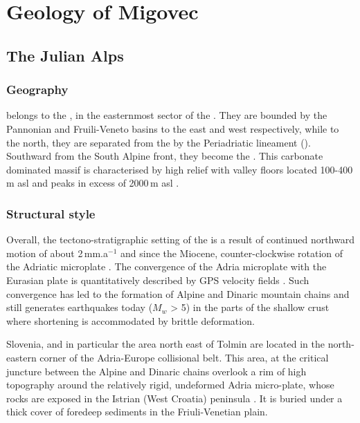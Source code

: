 \chapter{Geology of Migovec}

\section{The Julian Alps}
\label{sec:The Julian Alps}

\subsection{Geography} 
\label{par:Geography} 
 belongs to the , in the easternmost sector of the  \citep{bavec2004late}. 
They  are bounded by the Pannonian and  Fruili-Veneto basins to the east and west respectively, while to the north, they are separated from the  by the Periadriatic lineament (). Southward from the South Alpine front, they become the  \citep{placer1998contribution,burrato2008sources}.
This carbonate dominated massif is characterised by high relief with valley floors located 100-400\,m asl and peaks in excess of 2000\,m asl  \citep{vsmuc2009tectonic}. 

\subsection{Structural style}
\label{par:Structural style}
Overall, the tectono-stratigraphic setting  of the  is a result of continued northward motion of about 2\,mm.a$^{-1}$ \citep{burrato2008sources} and since the Miocene,  counter-clockwise rotation of the Adriatic microplate \citep{marton2003palaeomagnetic}. 
The convergence of the Adria microplate with the Eurasian plate is quantitatively described by GPS velocity fields \citep{grenerczy2005tectonic}. 
Such convergence has led to the formation of Alpine and Dinaric mountain chains and still generates earthquakes today ($M_w$ > 5) in the parts of the shallow crust where shortening is accommodated by brittle deformation.

Slovenia, and in particular the area north east of Tolmin are located in the north-eastern corner of the Adria-Europe collisional belt. 
This area, at the critical juncture between the Alpine and Dinaric chains overlook a rim of high topography around the relatively rigid, undeformed Adria micro-plate, whose rocks are  exposed in the Istrian (West Croatia) peninsula \citep{vsmuc2009tectonic}. 
It is buried under a thick cover of foredeep sediments in the Friuli-Venetian plain. 

